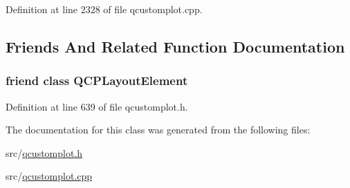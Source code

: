 Definition at line 2328 of file qcustomplot.\-cpp.



\subsection{Friends And Related Function Documentation}
\hypertarget{class_q_c_p_layout_a0790750c7e7f14fdbd960d172655b42b}{
\subsubsection[{Q\-C\-P\-Layout\-Element}]{\setlength{\rightskip}{0pt plus 5cm}friend class {\bf Q\-C\-P\-Layout\-Element}\hspace{0.3cm}{\ttfamily [friend]}}}\label{class_q_c_p_layout_a0790750c7e7f14fdbd960d172655b42b}


Definition at line 639 of file qcustomplot.\-h.



The documentation for this class was generated from the following files\-:\begin{DoxyCompactItemize}
\item 
src/\hyperlink{qcustomplot_8h}{qcustomplot.\-h}\item 
src/\hyperlink{qcustomplot_8cpp}{qcustomplot.\-cpp}\end{DoxyCompactItemize}
